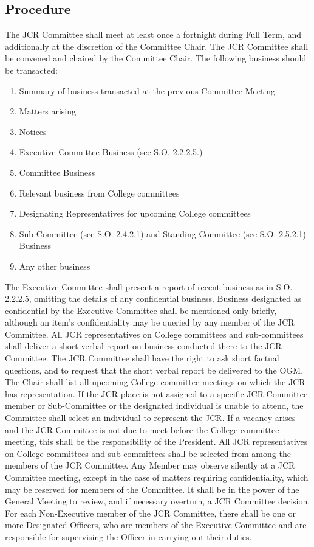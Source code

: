 \subsection{Procedure}
\npara The JCR Committee shall meet at least once a fortnight during Full Term, and additionally at the discretion of the Committee Chair.
\npara The JCR Committee shall be convened and chaired by the Committee Chair.
\npara \label{transacted_business}The following business should be transacted:
\begin{enumerate}
	\item Summary of business transacted at the previous Committee Meeting
	\item Matters arising
	\item Notices
	\item \label{exec_business}Executive Committee Business (see S.O. 2.2.2.5.)
	\item Committee Business
	\item Relevant business from College committees
	\item Designating Representatives for upcoming College committees
	\item Sub-Committee (see S.O. 2.4.2.1) and Standing Committee (see S.O. 2.5.2.1) Business
	\item Any other business
\end{enumerate}
\npara The Executive Committee shall present a report of recent business as in S.O. 2.2.2.5, omitting the details of any confidential business.
Business designated as confidential by the Executive Committee shall be mentioned only briefly, although an item's confidentiality may be queried by any member of the JCR Committee.
\npara All JCR representatives on College committees and sub-committees shall deliver a short verbal report on business conducted there to the JCR Committee.
The JCR Committee shall have the right to ask short factual questions, and to request that the short verbal report be delivered to the OGM.
\npara The Chair shall list all upcoming College committee meetings on which the JCR has representation.
If the JCR place is not assigned to a specific JCR Committee member or Sub-Committee or the designated individual is unable to attend, the Committee shall select an individual to represent the JCR.
If a vacancy arises and the JCR Committee is not due to meet before the College committee meeting, this shall be the responsibility of the President.
All JCR representatives on College committees and sub-committees shall be selected from among the members of the JCR Committee.
\npara Any Member may observe silently at a JCR Committee meeting, except in the case of matters requiring confidentiality, which may be reserved for members of the Committee.
\npara It shall be in the power of the General Meeting to review, and if necessary overturn, a JCR Committee decision.
\npara For each Non-Executive member of the JCR Committee, there shall be one or more Designated Officers, who are members of the Executive Committee and are responsible for supervising the Officer in carrying out their duties.
